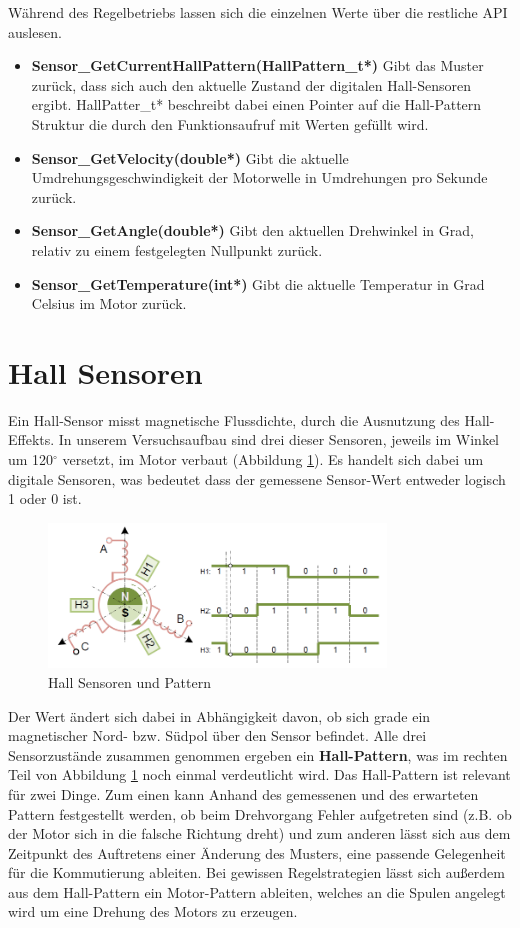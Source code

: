 \noindent
Während des Regelbetriebs lassen sich die einzelnen Werte über die restliche API auslesen.

\begin{itemize}
\item \textbf{Sensor\_GetCurrentHallPattern(HallPattern\_t*)} Gibt das Muster zurück, dass sich auch den aktuelle Zustand der digitalen Hall-Sensoren ergibt. HallPatter\_t* beschreibt dabei einen Pointer auf die Hall-Pattern Struktur die durch den Funktionsaufruf mit Werten gefüllt wird.
\item \textbf{Sensor\_GetVelocity(double*)} Gibt die aktuelle Umdrehungsgeschwindigkeit der Motorwelle in Umdrehungen pro Sekunde zurück.
\item \textbf{Sensor\_GetAngle(double*)} Gibt den aktuellen Drehwinkel in Grad, relativ zu einem festgelegten Nullpunkt zurück.
\item \textbf{Sensor\_GetTemperature(int*)} Gibt die aktuelle Temperatur in Grad Celsius im Motor zurück.
\end{itemize}

\section{Hall Sensoren}
Ein Hall-Sensor misst magnetische Flussdichte, durch die Ausnutzung des Hall-Effekts. In unserem Versuchsaufbau sind drei dieser Sensoren, jeweils im Winkel um 120$^\circ$ versetzt, im Motor verbaut (Abbildung \ref{img:hall_sample}). Es handelt sich dabei um digitale Sensoren, was bedeutet dass der gemessene Sensor-Wert entweder logisch 1 oder 0 ist.

\begin{figure}[ht]
\centering
\includegraphics[width=0.8\textwidth]{sensor/hall_sample.PNG}
\caption{Hall Sensoren und Pattern}
\label{img:hall_sample}
\end{figure}

Der Wert ändert sich dabei in Abhängigkeit davon, ob sich grade ein magnetischer Nord- bzw. Südpol über den Sensor befindet. Alle drei Sensorzustände zusammen genommen ergeben ein \textbf{Hall-Pattern}, was im rechten Teil von Abbildung \ref{img:hall_sample} noch einmal verdeutlicht wird. Das Hall-Pattern ist relevant für zwei Dinge. Zum einen kann Anhand des gemessenen und des erwarteten Pattern festgestellt werden, ob beim Drehvorgang Fehler aufgetreten sind (z.B. ob der Motor sich in die falsche Richtung dreht) und zum anderen lässt sich aus dem Zeitpunkt des Auftretens einer Änderung des Musters, eine passende Gelegenheit für die Kommutierung ableiten. Bei gewissen Regelstrategien lässt sich außerdem aus dem Hall-Pattern ein Motor-Pattern ableiten, welches an die Spulen angelegt wird um eine Drehung des Motors zu erzeugen.

